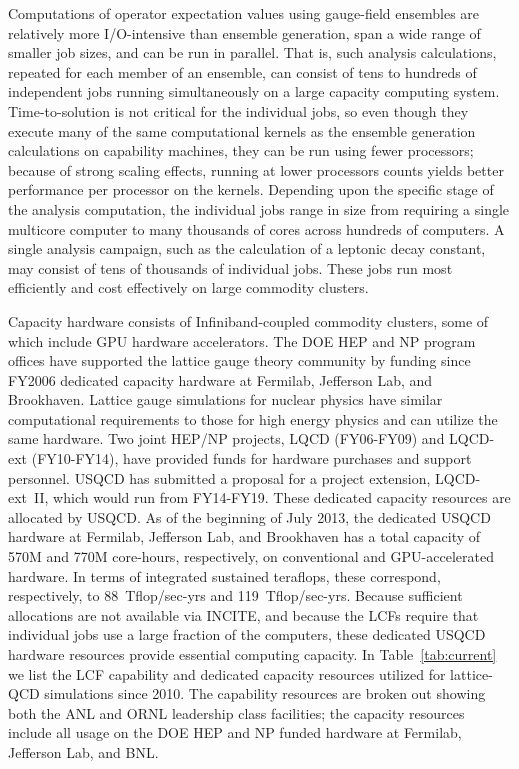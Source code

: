 Computations of operator expectation values using gauge-field ensembles are
relatively more I/O-intensive than ensemble generation, span a wide range of
smaller job sizes, and can be run in parallel.  That is, such analysis
calculations, repeated for each member of an ensemble, can consist of tens to
hundreds of independent jobs running simultaneously on a large capacity
computing system.  Time-to-solution is not critical for the individual jobs,
so even though they execute many of the same computational kernels as the
ensemble generation calculations on capability machines, they can be run using
fewer processors; because of strong scaling effects, running at lower
processors counts yields better performance per processor on the kernels.
Depending upon the specific stage of the analysis computation, the individual
jobs range in size from requiring a single multicore computer to many
thousands of cores across hundreds of computers.  A single analysis campaign,
such as the calculation of a leptonic decay constant, may consist of tens of
thousands of individual jobs.  These jobs run most efficiently and cost
effectively on large commodity clusters.

Capacity hardware consists of Infiniband-coupled commodity clusters, some of
which include GPU hardware
accelerators.  The DOE HEP and NP program offices have supported the lattice
gauge theory community by funding since FY2006 dedicated capacity hardware at
Fermilab, Jefferson Lab, and Brookhaven.  Lattice gauge simulations for
nuclear physics have similar computational requirements to those for high
energy physics and can utilize the same hardware.  Two joint HEP/NP projects,
LQCD (FY06-FY09) and LQCD-ext (FY10-FY14), have provided funds for hardware
purchases and support personnel.  USQCD has submitted a proposal for a project extension, LQCD-ext~II, which would run from FY14-FY19.  These dedicated capacity
resources are allocated by USQCD.  As of the beginning of July 2013, the
dedicated USQCD hardware at Fermilab, Jefferson Lab, and Brookhaven has a
total capacity of 570M and 770M core-hours, respectively, on conventional and
GPU-accelerated hardware.  In terms of integrated sustained teraflops, these
correspond, respectively, to 88~Tflop/sec-yrs and 119~Tflop/sec-yrs.
Because sufficient allocations are not available via INCITE, and because the LCFs require that individual jobs use a large fraction of the computers, these dedicated
USQCD hardware resources provide essential computing capacity.
In Table~\ref{tab:current} we list the LCF capability and dedicated
capacity resources utilized for lattice-QCD simulations since 2010.
The capability resources are broken out showing both the ANL and ORNL
leadership class facilities; the capacity resources include all usage  on the 
DOE HEP and NP funded hardware at Fermilab, Jefferson Lab, and BNL.

